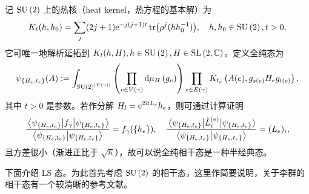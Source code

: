 		记 $\mathrm{SU}\left(2\right)$ 上的热核（heat kernel，热方程的基本解）为
		\begin{equation}
			K_t(h,h_0) = \sum_{j} (2j+1) \e{-j(j+1)t} \tr(\rho^j(h h_0^{-1})) \qc h,h_0\in \SU{2},t>0,
		\end{equation}
		它可唯一地解析延拓到 $K_t(h,H),h\in\mathrm{SU}\left(2\right),H\in \mathrm{SL}\left( 2,\mathbb{C} \right)$。定义全纯态为
		\begin{equation}
			\psi_{\{H_e,t_e\}}(A) := \int_{\mathrm{SU}\left(2\right)^{\abs{V(\gamma)}}} \left( \prod_{v\in V(\gamma)} \dd{\mu_H}(g_v) \right) \prod_{e\in E(\gamma)} K_{t_e}\left( A(e), g_{s(e)} H_e g_{t(e)} \right),
		\end{equation}
		其中 $t>0$ 是参数。若作分解 $H_l = \mathrm{e}^{2\mathrm{i} t L_e} h_e$，则可通过计算证明
		\begin{equation}
			\frac{\mel{\psi_{\{H_e,t_e\}}}{f_\gamma}{\psi_{\{H_e,t_e\}}}}{\ip{\psi_{\{H_e,t_e\}}}} = f_\gamma(\{h_e\}) \qc \frac{\mel{\psi_{\{H_e,t_e\}}}{\hat{L}_i^{(e)}}{\psi_{\{H_e,t_e\}}}}{\ip{\psi_{\{H_e,t_e\}}}} = (L_{e})_i,
		\end{equation}
		且方差很小（渐进正比于 $\sqrt{\hbar}$），故可以说全纯相干态是一种半经典态。

		下面介绍 LS 态。为此首先考虑 $\mathrm{SU}\left(2\right)$ 的相干态，这里作简要说明，关于李群的相干态有一个较清晰的参考文献\cite{Perelomov1971}。

